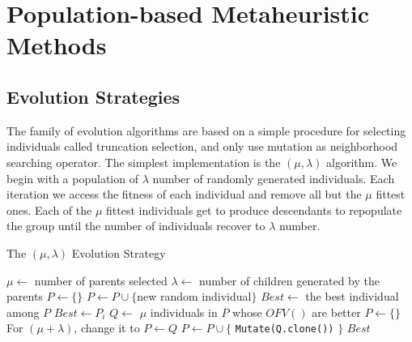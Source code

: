         \section{Population-based Metaheuristic Methods}
            \subsection{Evolution Strategies}
                The family of evolution algorithms are based on a simple procedure for selecting individuals called truncation selection, and only use mutation as neighborhood searching operator. The simplest implementation is the $(\mu, \lambda)$ algorithm. We begin with a population of $\lambda$ number of randomly generated individuals. Each iteration we access the fitness of each individual and remove all but the $\mu$ fittest ones. Each of the $\mu$ fittest individuals get to produce descendants to repopulate the group until the number of individuals recover to $\lambda$ number.

                \begin{algorithm}[!htp]
                    \centering
                    \caption{The $(\mu, \lambda)$ Evolution Strategy}
                    \begin{algorithmic}[1]
                        \State $\mu \gets$ number of parents selected
                        \State $\lambda \gets$ number of children generated by the parents
                        \State $P \gets \{\}$
                            \State $P \gets P \cup \{$new random individual$\}$
                        \EndWhile
                        \State $Best \gets$ the best individual among $P$
                                    \State $Best \gets P_i$
                                \EndIf
                            \EndFor
                            \State $Q \gets$ $\mu$ individuals in $P$ whose $OFV()$ are better
                            \State $P \gets \{\}$\Comment For $(\mu + \lambda)$, change it to $P \gets Q$
                                    \State $P \gets P \cup \{$ \texttt{Mutate(Q.clone())} $\}$
                                \EndFor
                            \EndFor
                        \EndWhile
                        \State \Return $Best$
                    \end{algorithmic}
                \end{algorithm}
                
